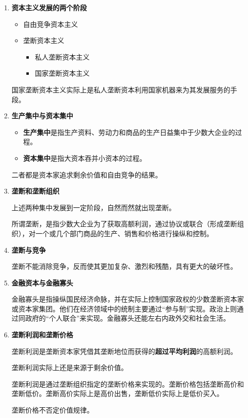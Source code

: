 \documentclass[12pt, a4paper, oneside]{ctexart}
\begin{document}
\begin{enumerate}
  \item {\bf 资本主义发展的两个阶段}

  \begin{itemize}
    \item 自由竞争资本主义
    \item 垄断资本主义
    \begin{itemize}
      \item 私人垄断资本主义
      \item 国家垄断资本主义
    \end{itemize}
  \end{itemize}

  国家垄断资本主义实际上是私人垄断资本利用国家机器来为其发展服务的手段。

  \item {\bf 生产集中与资本集中}
  
  \begin{itemize}
    \item {\bf 生产集中}是指生产资料、劳动力和商品的生产日益集中于少数大企业的过程。
    \item {\bf 资本集中}是指大资本吞并小资本的过程。
  \end{itemize}

  二者都是资本家追求剩余价值和自由竞争的结果。

  \item {\bf 垄断和垄断组织}
  
  上述两种集中发展到一定阶段，自然而然就出现垄断。

  所谓垄断，是指少数大企业为了获取高额利润，通过协议或联合（形成垄断组织），对一个或几个部门商品的生产、销售和价格进行操纵和控制。

  \item {\bf 垄断与竞争}
  
  垄断不能消除竞争，反而使其更加复杂、激烈和残酷，具有更大的破坏性。

  \item {\bf 金融资本与金融寡头}
  
  金融寡头是指操纵国民经济命脉，并在实际上控制国家政权的少数垄断资本家或资本家集团。他们在经济领域中的统制主要通过“参与制”实现。政治上则通过同政府的“个人联合”来实现。金融寡头还能左右内政外交和社会生活。

  \item {\bf 垄断利润和垄断价格}
  
  垄断利润是垄断资本家凭借其垄断地位而获得的\textbf{超过平均利润}的高额利润。

  垄断利润实际上还是来源于剩余价值。

  垄断利润是通过垄断组织指定的垄断价格来实现的。垄断价格包括垄断高价和垄断低价。垄断高价实际上是高价出售，垄断低价实际上是低价买入。

  垄断价格不否定价值规律。

\end{enumerate}
\end{document}

